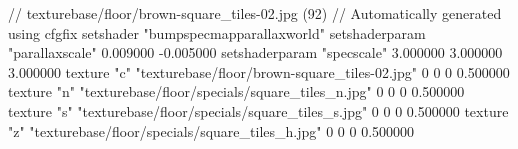 // texturebase/floor/brown-square_tiles-02.jpg (92)
// Automatically generated using cfgfix
setshader "bumpspecmapparallaxworld"
setshaderparam "parallaxscale" 0.009000 -0.005000
setshaderparam "specscale" 3.000000 3.000000 3.000000
texture "c" "texturebase/floor/brown-square_tiles-02.jpg" 0 0 0 0.500000
texture "n" "texturebase/floor/specials/square_tiles_n.jpg" 0 0 0 0.500000
texture "s" "texturebase/floor/specials/square_tiles_s.jpg" 0 0 0 0.500000
texture "z" "texturebase/floor/specials/square_tiles_h.jpg" 0 0 0 0.500000

